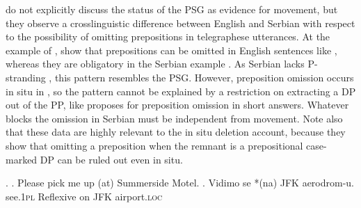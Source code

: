 \citet{barton.progovac2005} do not explicitly discuss the status of the PSG as evidence for movement, but they observe a crosslinguistic difference between English and Serbian with respect to the possibility of omitting prepositions  in telegraphese utterances. At the example of \Next, \citet[88,89]{barton.progovac2005} show that prepositions can be omitted in English sentences like \Next[a], whereas they are obligatory in the Serbian example \Next[b]. As Serbian lacks P-stranding \citep[667--668]{merchant2004}, this pattern resembles the PSG. However, preposition omission occurs in situ in \Next, so the pattern cannot be explained by a restriction on extracting a DP out of the PP, like \citet{merchant2004} proposes for preposition omission in short answers. Whatever blocks the omission in Serbian must be independent from movement. Note also that these data are highly relevant to the in situ deletion account, because they show that omitting a preposition when the remnant is a prepositional case-marked DP can be ruled out even in situ.

\ex. \a. Please pick me up (at) Summerside Motel.
\bg. Vidimo se *(na) JFK aerodrom-u.\\
see.\textsc{1pl} Reflexive \phantom{*(}on JFK airport.\textsc{loc}\\

